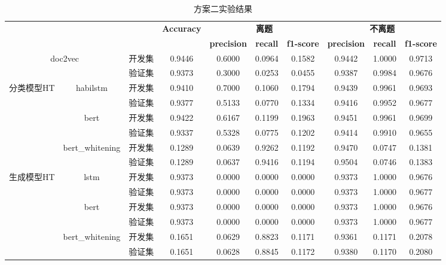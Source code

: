 \documentclass[11pt]{article}
\begin{document}
\begin{CJK}{UTF8}{gkai}
\begin{table}[htbp]\small
  \centering
    \begin{tabular}{c|ccccccccc}
      \hline
      \multicolumn{3}{c}{\multirow{2}[1]{*}{}} & \multirow{2}[1]{*}{\textbf{Accuracy}} & \multicolumn{3}{c}{\textbf{离题}} & \multicolumn{3}{c}{\textbf{不离题}} \\
      \multicolumn{3}{c}{}  &       & \textbf{precision} & \textbf{recall} & \textbf{f1-score} & \textbf{precision} & \textbf{recall} & \multicolumn{1}{c}{\textbf{f1-score}} \\
      \hline
      \multicolumn{2}{c}{\multirow{2}[0]{*}{doc2vec}} & 开发集   & 0.9446  & 0.6000  & 0.0964  & 0.1582  & 0.9442  & 1.0000  & 0.9713  \\
      \multicolumn{2}{c}{} & 验证集   & 0.9373  & 0.3000  & 0.0253  & 0.0455  & 0.9387  & 0.9984  & 0.9676  \\
      \hline
      \multirow{6}[0]{*}{分类模型HT} & \multirow{2}[0]{*}{habilstm} & 开发集   & 0.9410  & 0.7000  & 0.1060  & 0.1794  & 0.9439  & 0.9961  & 0.9693  \\
      &       & 验证集   & 0.9377  & 0.5133  & 0.0770  & 0.1334  & 0.9416  & 0.9952  & 0.9677  \\
      \cline{2-10}
      & \multirow{2}[0]{*}{bert} & 开发集   & 0.9422  & 0.6167  & 0.1199  & 0.1963  & 0.9451  & 0.9961  & 0.9699  \\
      &       & 验证集   & 0.9337  & 0.5328  & 0.0775  & 0.1202  & 0.9414  & 0.9910  & 0.9655  \\
      \cline{2-10}
      & \multirow{2}[0]{*}{bert\_whitening} & 开发集   & 0.1289  & 0.0639  & 0.9262  & 0.1192  & 0.9470  & 0.0747  & 0.1381  \\
      &       & 验证集   & 0.1289  & 0.0637  & 0.9416  & 0.1194  & 0.9504  & 0.0746  & 0.1383  \\
      \hline
      \multirow{6}[0]{*}{生成模型HT} & \multirow{2}[0]{*}{lstm} & 开发集   & 0.9373  & 0.0000  & 0.0000  & 0.0000  & 0.9373  & 1.0000  & 0.9676  \\
      &       & 验证集   & 0.9373  & 0.0000  & 0.0000  & 0.0000  & 0.9373  & 1.0000  & 0.9677  \\
      \cline{2-10}
      & \multirow{2}[0]{*}{bert} & 开发集   & 0.9373  & 0.0000  & 0.0000  & 0.0000  & 0.9373  & 1.0000  & 0.9676  \\
      &       & 验证集   & 0.9373  & 0.0000  & 0.0000  & 0.0000  & 0.9373  & 1.0000  & 0.9677  \\
      \cline{2-10}
      & \multirow{2}[0]{*}{bert\_whitening} & 开发集   & 0.1651  & 0.0629  & 0.8823  & 0.1171  & 0.9361  & 0.1171  & 0.2078  \\
      &       & 验证集   & 0.1651  & 0.0628  & 0.8845  & 0.1172  & 0.9380  & 0.1170  & 0.2080  \\
      \hline
    \end{tabular}%
  \caption{方案二实验结果}
  \label{tab:addlabel}%
\end{table}%


\end{CJK}
\end{document}

